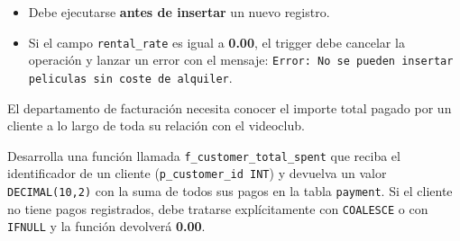 \documentclass[a4paper,11pt]{article}
\begin{document}
\begin{Form}
\begin{tcolorbox}[title={Ejercicio 2 (3 puntos) - Trigger de validación}]
\begin{itemize}
    \item Debe ejecutarse \textbf{antes de insertar} un nuevo registro.
    \item Si el campo \texttt{rental\_rate} es igual a \textbf{0.00}, el trigger debe cancelar la operación y lanzar un error con el mensaje: \texttt{Error: No se pueden insertar peliculas sin coste de alquiler}.
\end{itemize}
\end{tcolorbox}

\vspace{0.4cm}

\begin{tcolorbox}[title={Ejercicio 3 (3 puntos) - Función de consulta}]
El departamento de facturación necesita conocer el importe total pagado por un cliente a lo largo de toda su relación con el videoclub.

Desarrolla una función llamada \texttt{f\_customer\_total\_spent} que reciba el identificador de un cliente (\texttt{p\_customer\_id INT}) y devuelva un valor \texttt{DECIMAL(10,2)} con la suma de todos sus pagos en la tabla \texttt{payment}. Si el cliente no tiene pagos registrados, debe tratarse explícitamente con \texttt{COALESCE} o con \texttt{IFNULL} y la función devolverá \textbf{0.00}.
\end{tcolorbox}

\end{Form}
\end{document}
